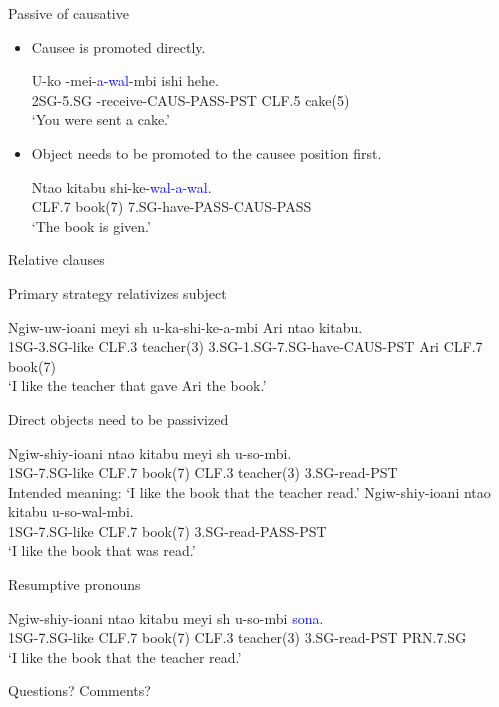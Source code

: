 \documentclass{beamer}
\newcommand{\exsc}[1]{{\tiny\MakeUppercase{#1}}}
\begin{document}
\begin{frame}{Passive of causative}
\begin{itemize}
\item Causee is promoted directly.
{\scriptsize
\begin{exe}
\sn
\gll U-ko -me\textbeltl i-\textcolor{blue}{\textbeltl a-wal\textramshorns}-mbi ishi hehe. \\
\exsc{2sg}-\exsc{5.sg} -receive-\exsc{caus}-\exsc{pass}-\exsc{pst} \exsc{clf.5} cake(5) \\
\trans `You were sent a cake.'
\end{exe}
}
\pause
\item Object needs to be promoted to the causee position first.
{\scriptsize
\begin{exe}
\sn
\gll Nta\textbeltl o kitabu shi-ke-\textcolor{blue}{wal\textramshorns-\textbeltl a-wal\textramshorns}. \\
\exsc{clf.7} book(7) \exsc{7.sg}-have-\exsc{pass}-\exsc{caus}-\exsc{pass} \\
\trans `The book is given.'
\end{exe}
}
\end{itemize}
\end{frame}

\begin{frame}{Relative clauses}

Primary strategy relativizes subject
{\scriptsize
\begin{exe}
\sn
\gll Ngiw-uw-ioani meyi {sh\textramshorns} u-ka-shi-ke-\textbeltl a-mbi Ari nta\textbeltl o kitabu. \\
{\tiny 1SG}-{\tiny 3.SG}-like {\tiny CLF.3} teacher(3) {\tiny 3.SG}-{\tiny 1.SG}-{\tiny 7.SG}-have-{\tiny CAUS}-{\tiny PST} Ari {\tiny CLF.7} book(7) \\
\trans `I like the teacher that gave Ari the book.'
\end{exe}
}
\pause
Direct objects need to be passivized
{\scriptsize
\begin{exe}
\sn
\gll * Ngiw-shiy-ioani nta\textbeltl o kitabu meyi {sh\textramshorns} u-so-mbi. \\
{} {\tiny 1SG}-{\tiny 7.SG}-like {\tiny CLF.7} book(7) {\tiny CLF.3} teacher(3) {\tiny 3.SG}-read-{\tiny PST} \\
\trans Intended meaning: `I like the book that the teacher read.'
\sn
\gll Ngiw-shiy-ioani nta\textbeltl o kitabu u-so-wal\textramshorns-mbi. \\
{\tiny 1SG}-{\tiny 7.SG}-like {\tiny CLF.7} book(7) {\tiny 3.SG}-read-{\tiny PASS}-{\tiny PST} \\
\trans `I like the book that was read.'
\end{exe}
}
Resumptive pronouns
{\scriptsize
\begin{exe}
\sn
\gll Ngiw-shiy-ioani nta\textbeltl o kitabu meyi {sh\textramshorns} u-so-mbi \textcolor{blue}{sona}. \\
{\tiny 1SG}-{\tiny 7.SG}-like {\tiny CLF.7} book(7) {\tiny CLF.3} teacher(3) {\tiny 3.SG}-read-{\tiny PST} {\tiny PRN.7.SG} \\
\trans `I like the book that the teacher read.'
\end{exe}
}
\end{frame}

\begin{frame}[c]
\Huge Questions? Comments?
\end{frame}
\end{document}
